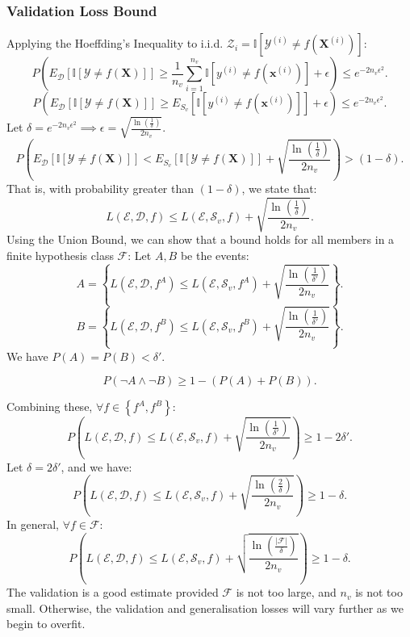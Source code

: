 \subsubsection{Validation Loss Bound}
Applying the Hoeffding's Inequality to i.i.d. $\mathcal{Z}_i=\mathbb{I}\left[ \mathcal{Y}^{(i)}\neq f\left( \mathcal{\mathbf{X}}^{(i)} \right) \right]$:
\[P\left( E_\mathcal{D}\left[ \mathbb{I}\left[ \mathcal{Y}\neq f\left( \mathcal{\mathbf{X}} \right)  \right] \right] \ge \frac{1}{n_v}\sum_{i=1}^{n_v} \mathbb{I}\left[ y^{(i)}\neq f(\mathbf{x}^{(i)}) \right] + \epsilon\right)\le e^{-2n_v\epsilon^{2}}.\] 
\[P\left( E_\mathcal{D}\left[ \mathbb{I}\left[ \mathcal{Y}\neq f\left( \mathcal{\mathbf{X}} \right)  \right] \right] \ge E_{S_v} \left[ \mathbb{I}\left[ y^{(i)}\neq f(\mathbf{x}^{(i)}) \right] \right] + \epsilon\right)\le e^{-2n_v\epsilon^{2}}.\] 
Let $\delta=e^{-2n_v\epsilon^{2}}\implies\epsilon=\sqrt{\frac{\ln\left( \frac{1}{\delta} \right) }{2n_v}}$.
\[P\left( E_\mathcal{D}\left[ \mathbb{I}\left[ \mathcal{Y}\neq f\left( \mathcal{\mathbf{X}} \right)  \right] \right] < E_{S_v} \left[ \mathbb{I}\left[ \mathcal{Y}\neq f(\mathcal{\mathbf{X}}) \right] \right] + \sqrt{\frac{\ln\left( \frac{1}{\delta} \right) }{2n_v}}\right)> (1-\delta).\] 
That is, with probability greater than $(1-\delta)$, we state that:
\[L(\mathcal{E}, \mathcal{D}, f)\le L(\mathcal{E}, \mathcal{S}_v, f)+\sqrt{\frac{\ln\left( \frac{1}{\delta} \right) }{2n_v}}.\] 
Using the Union Bound, we can show that a bound holds for all members in a finite hypothesis class
$\mathcal{F}$:
Let $A,B$ be the events:
\[A=\left\{ L(\mathcal{E}, \mathcal{D}, f^{A})\le L(\mathcal{E}, \mathcal{S}_v, f^{A})+\sqrt{\frac{\ln\left( \frac{1}{\delta'} \right) }{2n_v}} \right\}.\] 
\[B=\left\{ L(\mathcal{E}, \mathcal{D}, f^{B})\le L(\mathcal{E}, \mathcal{S}_v, f^{B})+\sqrt{\frac{\ln\left( \frac{1}{\delta'} \right) }{2n_v}} \right\}.\] 
We have $P(A)=P(B)<\delta'$.
\begin{remark}
  \[P(\neg A\wedge\neg B)\ge 1-(P(A) + P(B)).\]
\end{remark}
Combining these, $\forall f \in \left\{ f^{A},f^{B} \right\}$:
\[P\left( L(\mathcal{E}, \mathcal{D}, f)\le L(\mathcal{E}, \mathcal{S}_v, f)+\sqrt{\frac{\ln\left( \frac{1}{\delta'} \right) }{2n_v}} \right)\ge 1-2\delta'.\] 
Let $\delta=2\delta'$, and we have:
\[P\left( L(\mathcal{E}, \mathcal{D}, f)\le L(\mathcal{E}, \mathcal{S}_v, f)+\sqrt{\frac{\ln\left( \frac{2}{\delta} \right) }{2n_v}} \right)\ge 1-\delta.\] 
In general, $\forall f\in\mathcal{F}$:
\[P\left( L(\mathcal{E}, \mathcal{D}, f)\le L(\mathcal{E}, \mathcal{S}_v, f)+\sqrt{\frac{\ln\left( \frac{\left| {\mathcal{F}} \right|}{\delta} \right) }{2n_v}} \right)\ge 1-\delta.\] 
The validation is a good estimate provided $\mathcal{F}$ is not too large, and
$n_v$ is not too small. Otherwise, the validation and generalisation losses
will vary further as we begin to overfit.


